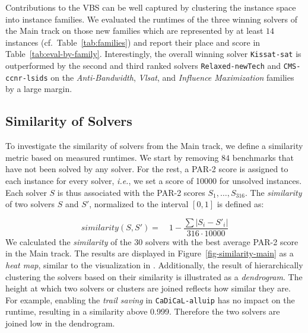 \documentclass{elsarticle}
\newcommand{\solver}[1]{\texttt{#1}}
\begin{document}
Contributions to the VBS can be well captured by clustering the instance space into instance families. 
We evaluated the runtimes of the three winning solvers of the Main track on those new families which are represented by at least $14$ instances (cf.~Table~\ref{tab:families})
and report their place and score in Table~\ref{tab:eval-by-family}. 
Interestingly, the overall winning solver \solver{Kissat-sat} is outperformed by the second and third ranked solvers \solver{Relaxed-newTech} and \solver{CMS-ccnr-lsids} on the \emph{Anti-Bandwidth}, \emph{Vlsat}, and \emph{Influence Maximization} families by a large margin. 

\subsection{Similarity of Solvers}
To investigate the similarity of solvers from the Main track, we define a
similarity metric based on measured runtimes. We start by removing $84$
benchmarks that have not been solved by any solver. For the rest, a PAR-2 score
is assigned to each instance for every solver,
\emph{i.e.}, we set a score of \num{10000} for unsolved instances.
Each solver $S$ is thus associated with the PAR-2 scores $S_{1},\dots,S_{316}$.
The \emph{similarity} of two solvers $S$
and $S'$, normalized to the interval $[0,1]$ is defined
as:

\[
	similarity(S, S') =\quad 1 - \frac{\sum{|S_{i} - S'_{i}|}}{316 \cdot \num{10000}}
\]
We calculated the \emph{similarity} of the $30$ solvers with the
best average PAR-2 score in the Main track. The results are displayed in
Figure~\ref{fig-similarity-main} as a \emph{heat map}, similar to the visualization in \cite{Balyo:2015:SATRace}. Additionally, the result
of hierarchically clustering the solvers based on their similarity is
illustrated as a \emph{dendrogram}. The height at which two solvers or clusters
are joined reflects how similar they are. For example, enabling the \emph{trail
  saving} in \solver{CaDiCaL-alluip} has no impact on the runtime, resulting in
a similarity above \num{0.999}. Therefore the two solvers are joined low in the
dendrogram.
\end{document}
